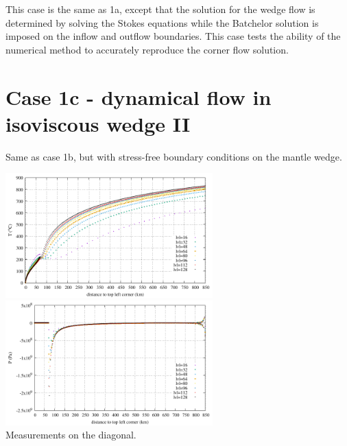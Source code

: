 This case is the same as 1a, except that the solution
for the wedge flow is determined by solving the Stokes equations while the Batchelor solution is
imposed on the inflow and outflow boundaries. This case tests the ability of the numerical method
to accurately reproduce the corner flow solution.

\newpage
\section*{Case 1c - dynamical flow in isoviscous wedge II} 

Same as case 1b, but with stress-free boundary conditions on the mantle wedge.

\begin{center}
\includegraphics[width=8cm]{python_codes/fieldstone_149/results/case1c/diagT.pdf}
\includegraphics[width=8cm]{python_codes/fieldstone_149/results/case1c/diagP.pdf}\\
{\captionfont Measurements on the diagonal.} 
\end{center}

